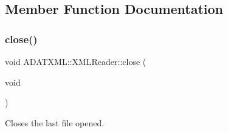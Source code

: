 \subsection{Member Function Documentation}
\mbox{\label{classADATXML_1_1XMLReader_a0e5f84d85bb03e1ba3c01a20b1642a36}} 
\subsubsection{\texorpdfstring{close()}{close()}\hspace{0.1cm}{\footnotesize\ttfamily [1/3]}}
{\footnotesize\ttfamily void A\+D\+A\+T\+X\+M\+L\+::\+X\+M\+L\+Reader\+::close (\begin{DoxyParamCaption}\item[{void}]{ }\end{DoxyParamCaption})\hspace{0.3cm}{\ttfamily [inline]}}



Closes the last file opened. 

